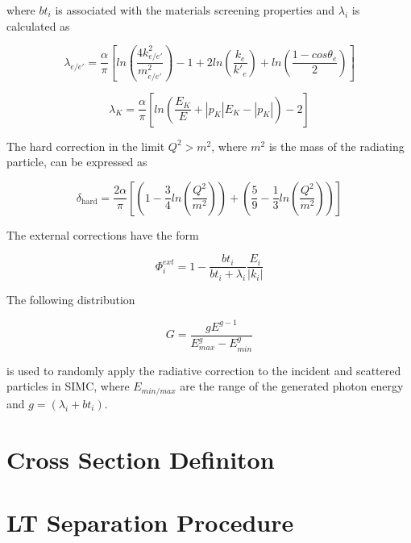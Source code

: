 \documentclass[
]{report}
\begin{document}
\noindent where \(bt_i\) is associated with the materials screening
properties and \(\lambda_i\) is calculated as

\begin{equation} 
  \lambda_{e/e'}=\frac{\alpha}{\pi}[ln(\frac{4k^2_{e/e'}}{m^2_{e/e'}})-1+2ln(\frac{k_e}{k'_e})+ln(\frac{1-cos\theta_e}{2})]
  \label{eq:lambda_e} 
\end{equation}

\begin{equation} 
  \lambda_{K}=\frac{\alpha}{\pi}[ln(\frac{E_K}{E}+\left|p_K\right|E_K-\left|p_K\right|)-2]
  \label{eq:lambda_k} 
\end{equation}

The hard correction in the limit \(Q^2>m^2\), where \(m^2\) is the mass
of the radiating particle, can be expressed as

\begin{equation} 
  \delta_{\text{hard}}=\frac{2\alpha}{\pi}[(1-\frac{3}{4}ln(\frac{Q^2}{m^2}))+(\frac{5}{9}-\frac{1}{3}ln(\frac{Q^2}{m^2}))]
  \label{eq:hard_corr} 
\end{equation}

The external corrections have the form

\begin{equation} 
  \Phi^{ext}_i=1-\frac{bt_i}{bt_i+\lambda_i}\frac{E_i}{\left|k_i\right|}
  \label{eq:ext_corr} 
\end{equation}

The following distribution

\begin{equation} 
  G=\frac{gE^{g-1}}{E^g_{max}-E^g_{min}}
  \label{eq:radiative_corr_distro} 
\end{equation}

\noindent is used to randomly apply the radiative correction to the
incident and scattered particles in SIMC, where \(E_{min/max}\) are the
range of the generated photon energy and \(g=(\lambda_i+bt_i)\).

\label{Chapter-7}

\hypertarget{Section-7.1}{%
\section{Cross Section Definiton}\label{Section-7.1}}

\hypertarget{Section-7.2}{%
\section{LT Separation Procedure}\label{Section-7.2}}
\end{document}
